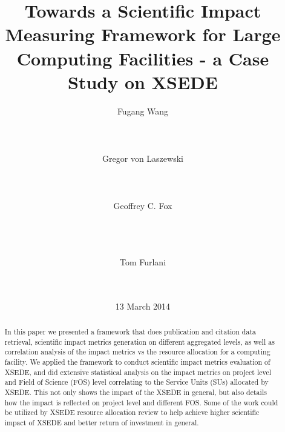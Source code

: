 \documentclass{sig-alternate}
\newcommand{\TITLE}{Towards a Scientific Impact Measuring Framework for Large Computing Facilities - a Case Study on XSEDE}
\begin{document}
%

\title{\TITLE}

\author{
\alignauthor
Fugang Wang\\
       \\
       \\
       \\
\alignauthor
Gregor von Laszewski\\
       \\
       \\
       \\
\alignauthor
Geoffrey C. Fox\\
       \\
       \\
       \\
\and  %
\alignauthor 
Tom Furlani\\
       \\
       \\
}
\date{13 March 2014}

\toappear{}
\maketitle
\begin{abstract}

In this paper we presented a framework that does publication and citation data retrieval, scientific impact metrics generation on different aggregated levels, as well as correlation analysis of the impact metrics vs the resource allocation for a computing facility. We applied the framework to conduct scientific impact metrics evaluation of XSEDE, and did extensive statistical analysis on the impact metrics on project level and Field of Science (FOS) level correlating to the Service Units (SUs) allocated by XSEDE. This not only shows the impact of the XSEDE in general, but also details how the impact is reflected on project level and different FOS. Some of the work could be utilized by XSEDE resource allocation review to help achieve higher scientific impact of XSEDE and better return of investment in general.

\end{abstract}
\end{document}
